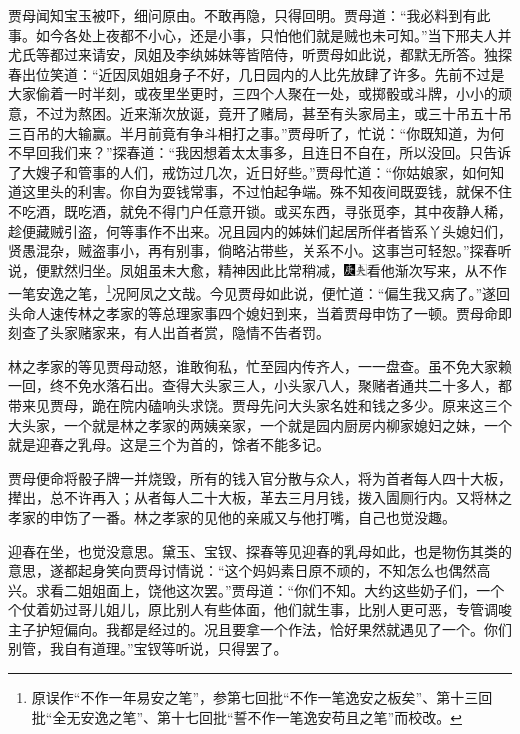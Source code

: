 贾母闻知宝玉被吓，细问原由。不敢再隐，只得回明。贾母道：“我必料到有此事。如今各处上夜都不小心，还是小事，只怕他们就是贼也未可知。”当下邢夫人并尤氏等都过来请安，凤姐及李纨姊妹等皆陪侍，听贾母如此说，都默无所答。独探春出位笑道：“近因凤姐姐身子不好，几日园内的人比先放肆了许多。先前不过是大家偷着一时半刻，或夜里坐更时，三四个人聚在一处，或掷骰或斗牌，小小的顽意，不过为熬困。近来渐次放诞，竟开了赌局，甚至有头家局主，或三十吊五十吊三百吊的大输赢。半月前竟有争斗相打之事。”贾母听了，忙说：“你既知道，为何不早回我们来？”探春道：“我因想着太太事多，且连日不自在，所以没回。只告诉了大嫂子和管事的人们，戒饬过几次，近日好些。”贾母忙道：“你姑娘家，如何知道这里头的利害。你自为耍钱常事，不过怕起争端。殊不知夜间既耍钱，就保不住不吃酒，既吃酒，就免不得门户任意开锁。或买东西，寻张觅李，其中夜静人稀，趁便藏贼引盗，何等事作不出来。况且园内的姊妹们起居所伴者皆系丫头媳妇们，贤愚混杂，贼盗事小，再有别事，倘略沾带些，关系不小。这事岂可轻恕。”探春听说，便默然归坐。凤姐虽未大愈，精神因此比常稍减，{\includegraphics[width=3mm]{../Images/00004}\includegraphics[width=3mm]{../Images/00012}\footnotesize \kaishu 看他渐次写来，从不作一笔安逸之笔，\footnote{原误作“不作一年易安之笔”，参第七回批“不作一笔逸安之板矣”、第十三回批“全无安逸之笔”、第十七回批“誓不作一笔逸安苟且之笔”而校改。}况阿凤之文哉。}今见贾母如此说，便忙道：“偏生我又病了。”遂回头命人速传林之孝家的等总理家事四个媳妇到来，当着贾母申饬了一顿。贾母命即刻查了头家赌家来，有人出首者赏，隐情不告者罚。

林之孝家的等见贾母动怒，谁敢徇私，忙至园内传齐人，一一盘查。虽不免大家赖一回，终不免水落石出。查得大头家三人，小头家八人，聚赌者通共二十多人，都带来见贾母，跪在院内磕响头求饶。贾母先问大头家名姓和钱之多少。原来这三个大头家，一个就是林之孝家的两姨亲家，一个就是园内厨房内柳家媳妇之妹，一个就是迎春之乳母。这是三个为首的，馀者不能多记。

贾母便命将骰子牌一并烧毁，所有的钱入官分散与众人，将为首者每人四十大板，撵出，总不许再入；从者每人二十大板，革去三月月钱，拨入圊厕行内。又将林之孝家的申饬了一番。林之孝家的见他的亲戚又与他打嘴，自己也觉没趣。

迎春在坐，也觉没意思。黛玉、宝钗、探春等见迎春的乳母如此，也是物伤其类的意思，遂都起身笑向贾母讨情说：“这个妈妈素日原不顽的，不知怎么也偶然高兴。求看二姐姐面上，饶他这次罢。”贾母道：“你们不知。大约这些奶子们，一个个仗着奶过哥儿姐儿，原比别人有些体面，他们就生事，比别人更可恶，专管调唆主子护短偏向。我都是经过的。况且要拿一个作法，恰好果然就遇见了一个。你们别管，我自有道理。”宝钗等听说，只得罢了。

